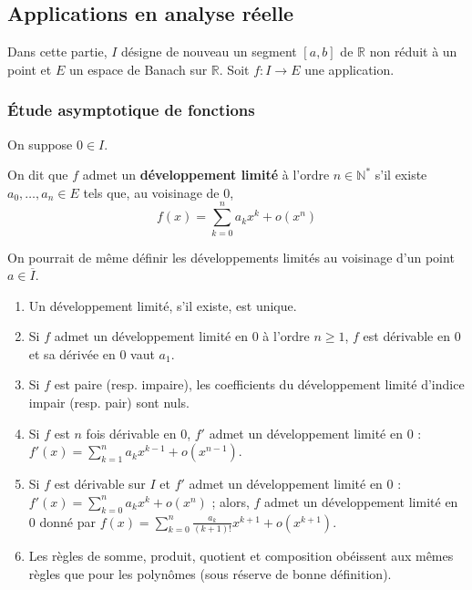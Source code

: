 	\subsection{Applications en analyse réelle}

	Dans cette partie, $I$ désigne de nouveau un segment $[a,b]$ de $\mathbb{R}$ non réduit à un point et $E$ un espace de Banach sur $\mathbb{R}$. Soit $f : I \rightarrow E$ une application.

	\subsubsection{Étude asymptotique de fonctions}


	On suppose $0 \in I$.

	\begin{definition}
		On dit que $f$ admet un \textbf{développement limité} à l'ordre $n \in \mathbb{N}^*$ s'il existe $a_0, \dots, a_n \in E$ tels que, au voisinage de $0$,
		\[ f(x) = \sum_{k=0}^{n} a_k x^k + o(x^n) \]
	\end{definition}

	\begin{remark}
		On pourrait de même définir les développements limités au voisinage d'un point $a \in \overline{I}$.
	\end{remark}

	\begin{proposition}
		\begin{enumerate}[label=(\roman*)]
			\item Un développement limité, s'il existe, est unique.
			\item Si $f$ admet un développement limité en $0$ à l'ordre $n \geq 1$, $f$ est dérivable en $0$ et sa dérivée en $0$ vaut $a_1$.
			\item Si $f$ est paire (resp. impaire), les coefficients du développement limité d'indice impair (resp. pair) sont nuls.
			\item Si $f$ est $n$ fois dérivable en $0$, $f'$ admet un développement limité en $0$ : $f'(x) = \sum_{k=1}^{n} a_k x^{k-1} + o(x^{n-1})$.
			\item Si $f$ est dérivable sur $I$ et $f'$ admet un développement limité en $0$ : $f'(x) = \sum_{k=0}^{n} a_k x^k + o(x^n)$ ; alors, $f$ admet un développement limité en $0$ donné par $f(x) = \sum_{k=0}^{n} \frac{a_k}{(k+1)!} x^{k+1} + o(x^{k+1})$.
			\item Les règles de somme, produit, quotient et composition obéissent aux mêmes règles que pour les polynômes (sous réserve de bonne définition).
		\end{enumerate}
	\end{proposition}

